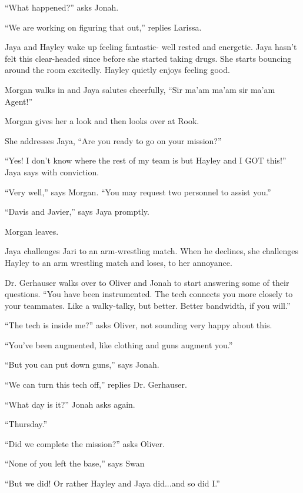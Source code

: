``What happened?'' asks Jonah.

``We are working on figuring that out,'' replies Larissa.



Jaya and Hayley wake up feeling fantastic- well rested and energetic.  Jaya hasn't felt this clear-headed since before she started taking drugs.  She starts bouncing around the room excitedly.  Hayley quietly enjoys feeling good.



Morgan walks in and Jaya salutes cheerfully, ``Sir ma'am ma'am sir ma'am Agent!''

Morgan gives her a look and then looks over at Rook.

She addresses Jaya, ``Are you ready to go on your mission?''

``Yes!  I don't know where the rest of my team is but Hayley and I GOT this!'' Jaya says with conviction.

``Very well,'' says Morgan.  ``You may request two personnel to assist you.''

``Davis and Javier,'' says Jaya promptly.

Morgan leaves.

Jaya challenges Jari to an arm-wrestling match.  When he declines, she challenges Hayley to an arm wrestling match and loses, to her annoyance.



Dr. Gerhauser walks over to Oliver and Jonah to start answering some of their questions.  ``You have been instrumented.  The tech connects you more closely to your teammates.  Like a walky-talky, but better.  Better bandwidth, if you will.''

``The tech is inside me?'' asks Oliver, not sounding very happy about this.

``You've been augmented, like clothing and guns augment you.''

``But you can put down guns,'' says Jonah.

``We can turn this tech off,'' replies Dr. Gerhauser.



``What day is it?'' Jonah asks again.

``Thursday.''

``Did we complete the mission?'' asks Oliver.

``None of you left the base,'' says Swan

``But we did!  Or rather Hayley and Jaya did...and so did I.''

